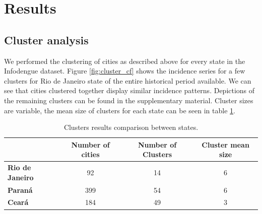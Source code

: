 \documentclass[12pt]{report}
\begin{document}
\section{Results}

\subsection{Cluster analysis}

We performed the clustering of cities as described above for every state in the Infodengue dataset. Figure \ref{fig:cluster_cf} shows the incidence series for a few clusters for Rio de Janeiro state of the entire historical period available. We can see that cities clustered together display similar incidence patterns. Depictions of the remaining clusters can be found in the supplementary material. Cluster sizes are variable, the mean size of clusters for each state can be seen in table \ref{tab:clusters_size}.

\begin{table}
\begin{center}
\begin{tabular}{lccc}
  & \textbf{Number of cities} & \textbf{Number of Clusters} & \textbf{Cluster mean size}\\
 \hline
 \textbf{Rio de Janeiro} & 92 & 14 & 6\\
 \textbf{Paraná} & 399 & 54 & 6 \\
 \textbf{Ceará} & 184 & 49 & 3 \\
 \hline
\end{tabular}
\label{tab:clusters_size}
\caption{Clusters results comparison between states.}
\end{center}
\end{table}
\end{document}
